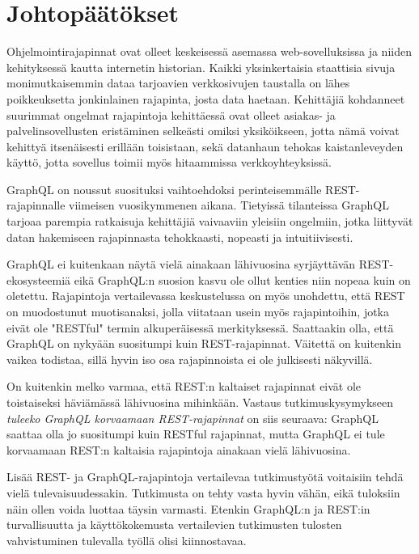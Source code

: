 \chapter{Johtopäätökset} \label{neljasluku}

\setlength{\parindent}{0em}
\setlength{\parskip}{1em}

Ohjelmointirajapinnat ovat olleet keskeisessä asemassa web-sovelluksissa ja niiden kehityksessä kautta internetin historian. Kaikki yksinkertaisia staattisia sivuja monimutkaisemmin dataa tarjoavien verkkosivujen taustalla on lähes poikkeuksetta jonkinlainen rajapinta, josta data haetaan. Kehittäjiä kohdanneet suurimmat ongelmat rajapintoja kehittäessä ovat olleet asiakas- ja palvelinsovellusten eristäminen selkeästi omiksi yksiköikseen, jotta nämä voivat kehittyä itsenäisesti erillään toisistaan, sekä datanhaun tehokas kaistanleveyden käyttö, jotta sovellus toimii myös hitaammissa verkkoyhteyksissä.

GraphQL on noussut suosituksi vaihtoehdoksi perinteisemmälle REST-rajapinnalle viimeisen vuosikymmenen aikana. Tietyissä tilanteissa GraphQL tarjoaa parempia ratkaisuja kehittäjiä vaivaaviin yleisiin ongelmiin, jotka liittyvät datan hakemiseen rajapinnasta tehokkaasti, nopeasti ja intuitiivisesti.

GraphQL ei kuitenkaan näytä vielä ainakaan lähivuosina syrjäyttävän REST-ekosysteemiä eikä GraphQL:n suosion kasvu ole ollut kenties niin nopeaa kuin on oletettu. Rajapintoja vertailevassa keskustelussa on myös unohdettu, että REST on muodostunut muotisanaksi, jolla viitataan usein myös rajapintoihin, jotka eivät ole "RESTful" termin alkuperäisessä merkityksessä. Saattaakin olla, että GraphQL on nykyään suositumpi kuin REST-rajapinnat. Väitettä on kuitenkin vaikea todistaa, sillä hyvin iso osa rajapinnoista ei ole julkisesti näkyvillä.

On kuitenkin melko varmaa, että REST:n kaltaiset rajapinnat eivät ole toistaiseksi häviämässä lähivuosina mihinkään. Vastaus tutkimuskysymykseen \textit{tuleeko GraphQL korvaamaan REST-rajapinnat} on siis seuraava: GraphQL saattaa olla jo suositumpi kuin RESTful rajapinnat, mutta GraphQL ei tule korvaamaan REST:n kaltaisia rajapintoja ainakaan vielä lähivuosina.

Lisää REST- ja GraphQL-rajapintoja vertailevaa tutkimustyötä voitaisiin tehdä vielä tulevaisuudessakin. Tutkimusta on tehty vasta hyvin vähän, eikä tuloksiin näin ollen voida luottaa täysin varmasti. Etenkin GraphQL:n ja REST:in turvallisuutta ja käyttökokemusta vertailevien tutkimusten tulosten vahvistuminen tulevalla työllä olisi kiinnostavaa.
